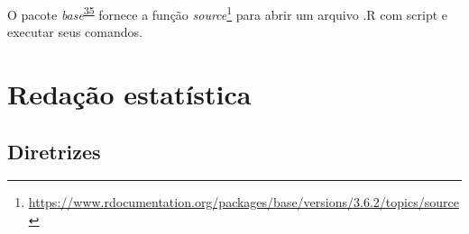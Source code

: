 \documentclass[
  a4paper,
]{book}
\renewcommand{\href}[2]{#2\footnote{\url{#1}}}
\newenvironment{infobox}[1]
  {
  \begin{itemize}
  \renewcommand{\labelitemi}{
    \raisebox{-.7\height}[0pt][0pt]{
      {\setkeys{Gin}{width=3em,keepaspectratio}
        \texttt{[image: \#1]}}
    }
  }
  \setlength{\fboxsep}{1em}
  \begin{blackbox}
  \item
  }
  {
  \end{blackbox}
  \end{itemize}
  }
\begin{document}
\begin{infobox}{images/Rlogo}
O pacote \emph{base}\textsuperscript{\protect\hyperlink{ref-base-2}{35}} fornece a função \href{https://www.rdocumentation.org/packages/base/versions/3.6.2/topics/source}{\emph{source}} para abrir um arquivo .R com script e executar seus comandos.

\end{infobox}

\hypertarget{redacao}{%
\chapter{\texorpdfstring{\textbf{Redação estatística}}{Redação estatística}}\label{redacao}}

\hypertarget{diretrizes}{%
\section{Diretrizes}\label{diretrizes}}
\end{document}
